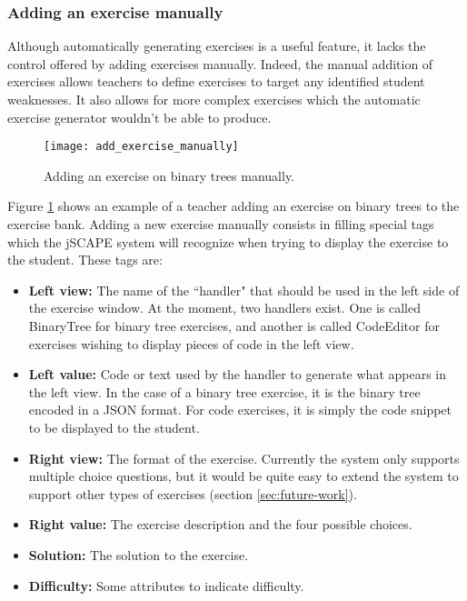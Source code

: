 \subsubsection{Adding an exercise manually}
Although automatically generating exercises is a useful feature, it lacks the control offered by adding exercises manually. Indeed, the manual addition of exercises allows teachers to define exercises to target any identified student weaknesses. It also allows for more complex exercises which the automatic exercise generator wouldn't be able to produce.

\begin{figure}[H]
\centering
\texttt{[image: add\_exercise\_manually]}
\caption{Adding an exercise on binary trees manually.}
\label{fig:add_exercise_manually}
\end{figure}

Figure \ref{fig:add_exercise_manually} shows an example of a teacher adding an exercise on binary trees to the exercise bank. Adding a new exercise manually consists in filling special tags which the jSCAPE system will recognize when trying to display the exercise to the student. These tags are:
\begin{itemize}
\item \textbf{Left view:} The name of the ``handler" that should be used in the left side of the exercise window. At the moment, two handlers exist. One is called BinaryTree for binary tree exercises, and another is called CodeEditor for exercises wishing to display pieces of code in the left view.
\item \textbf{Left value:} Code or text used by the handler to generate what appears in the left view. In the case of a binary tree exercise, it is the binary tree encoded in a JSON format. For code exercises, it is simply the code snippet to be displayed to the student.
\item \textbf{Right view:} The format of the exercise. Currently the system only supports multiple choice questions, but it would be quite easy to extend the system to support other types of exercises (section \ref{sec:future-work}).
\item \textbf{Right value:} The exercise description and the four possible choices.
\item \textbf{Solution:} The solution to the exercise.
\item \textbf{Difficulty:} Some attributes to indicate difficulty.
\end{itemize}

